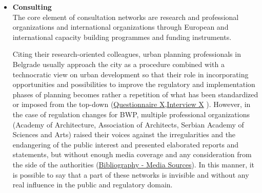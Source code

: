 \documentclass[11pt]{report}
\begin{document}
{{{{\begin{itemize}
This inconsistency of yet formalized institutional procedures may also be interpreted as a legacy of the centralized state from socialism which is still at play, although under a different political and economic regime praising neoliberal transition.
The artificial decentralization and democratization is now enriched with a layer of powerful economic actors,
\footnote{Not only the state as it was  the most powerful economic actor during socialism.}
who profit from top-down decision-making.
They couple with political powers in order to reduce control and verification procedures and troublesome professional actors to the minimum.
\\

\item \textbf{Consulting}
\\
The core element of consultation networks are research and professional organizations and international organizations through European and international capacity building programmes and funding instruments.

Citing their research-oriented colleagues, urban planning professionals in Belgrade usually approach the city as a procedure combined with a technocratic view on urban development so that their role in incorporating opportunities and possibilities to improve the regulatory and implementation phases of planning becomes rather a repetition of what has been standardized or imposed from the top-down (\href{Questionnaire Experts Savamala}{Questionnaire X},\href{InterviewX}{Interview X}
).
However, in the case of regulation changes for BWP, multiple professional organizations (Academy of Architecture, Association of Architects, Serbian Academy of Sciences and Arts) raised their voices against the irregularities and the endangering of the public interest and presented elaborated reports and statements, but without enough media coverage and any consideration from the side of the authorities (\href{Bibliography}{Bibliography - Media Sources}).
In this manner, it is possible to say that a part of these networks is invisible and without any real influence in the public and regulatory domain.


\end{itemize}}}}}
\end{document}
